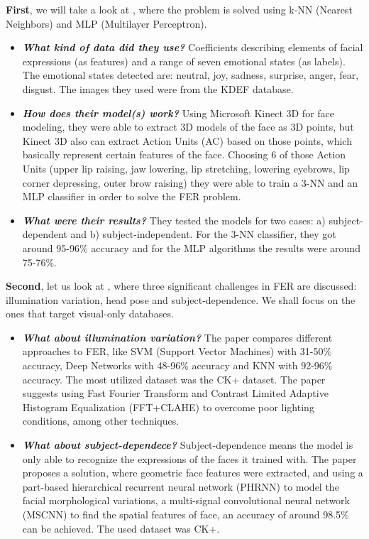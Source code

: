 \documentclass[runningheads,a4paper,11pt]{report}
\begin{document}
\textbf{First}, we will take a look at \cite{Tarnowski17}, where the problem is solved using k-NN (Nearest Neighbors) and MLP (Multilayer Perceptron).
\begin{itemize}
	\item \textbf{\emph{What kind of data did they use?}} Coefficients describing elements of facial expressions (as features) and a range of seven emotional states (as labels). The emotional states detected are: neutral, joy, sadness, surprise, anger, fear, disgust. The images they used were from the KDEF database.
	\item \textbf{\emph{How does their model(s) work?}} Using Microsoft Kinect 3D for face modeling, they were able to extract 3D models of the face as 3D points, but Kinect 3D also can extract Action Units (AC) based on those points, which basically represent certain features of the face. Choosing 6 of those Action Units (upper lip raising, jaw lowering, lip stretching, lowering eyebrows, lip corner depressing, outer brow raising) they were able to train a 3-NN and an MLP classifier in order to solve the FER problem.
	\item \textbf{\emph{What were their results?}} They tested the models for two cases: a) subject-dependent and b) subject-independent. For the 3-NN classifier, they got around 95-96\% accuracy and for the MLP algorithms the results were around 75-76\%. 
\end{itemize}

\textbf{Second}, let us look at \cite{Samadiani19}, where three significant challenges in FER are discussed: illumination variation, head pose and subject-dependence. We shall focus on the ones that target visual-only databases.
\begin{itemize}
	\item \textbf{\emph{What about illumination variation?}} The paper compares different approaches to FER, like SVM (Support Vector Machines) with 31-50\% accuracy, Deep Networks with 48-96\% accuracy and KNN with 92-96\% accuracy. The most utilized dataset was the CK+ dataset. The paper suggests using Fast Fourier Transform and Contrast Limited Adaptive Histogram Equalization (FFT+CLAHE) to overcome poor lighting conditions, among other techniques.
	\item \textbf{\emph{What about subject-dependece?}} Subject-dependence means the model is only able to recognize the expressions of the faces it trained with. The paper proposes a solution, where geometric face features were extracted, and using a part-based hierarchical recurrent neural network (PHRNN) to model the facial morphological variations, a multi-signal convolutional neural network (MSCNN) to find the spatial features of face, an accuracy of around 98.5\% can be achieved. The used dataset was CK+.
\end{itemize}
\end{document}
